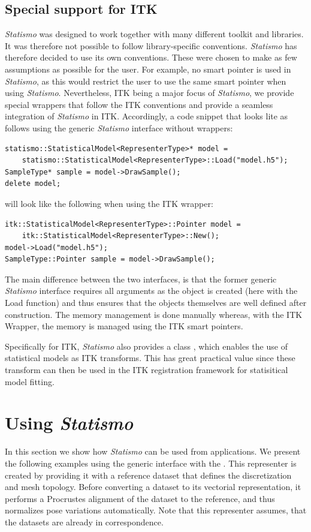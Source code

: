 \documentclass{InsightArticle}
\newcommand{\Statismo}{\emph{Statismo}\xspace}
\begin{document}
\subsection{Special support for ITK}
\Statismo was designed to work together with many different toolkit
and libraries. It was therefore not possible to follow library-specific
conventions. \Statismo has therefore decided to use its own conventions. These
were chosen to make as few assumptions as possible for the user. For example, no smart pointer is used in \Statismo, as
this would restrict the user to use the same smart pointer when using
\Statismo. Nevertheless, ITK being a major focus of \Statismo, we
provide special wrappers that follow the ITK conventions and provide a seamless integration of  \Statismo in ITK. 
Accordingly, a code snippet that looks lite as follows using the generic \Statismo interface without wrappers:
\begin{verbatim}
statismo::StatisticalModel<RepresenterType>* model = 
    statismo::StatisticalModel<RepresenterType>::Load("model.h5");
SampleType* sample = model->DrawSample();
delete model;
\end{verbatim}
will look like the following when using the ITK wrapper:
\begin{verbatim}
itk::StatisticalModel<RepresenterType>::Pointer model = 
    itk::StatisticalModel<RepresenterType>::New();
model->Load("model.h5");
SampleType::Pointer sample = model->DrawSample();
\end{verbatim}
The main difference between the two interfaces, is that the former generic \Statismo interface
requires all arguments as the object is created
(here with the Load function) and thus ensures that 
the objects themselves are well defined after construction.
The memory management is done manually whereas, with the ITK Wrapper, the memory is managed using the ITK smart pointers. 

Specifically for ITK, \Statismo also provides a class , which 
enables the use of statistical models as ITK transforms. This has great practical value since these transform can then be used in the  ITK registration framework for statisitical model fitting. 


\section{Using \Statismo}
In this section we show how \Statismo can be used from
applications. We present the following examples using the generic
interface with the . This representer is
created by providing it with a reference dataset that defines the
discretization and mesh topology. Before converting a dataset to its
vectorial representation, it performs a Procrustes alignment
\cite{TODO} of the dataset to the reference, and thus normalizes pose
variations automatically. Note that this representer assumes, that the
datasets are already in correspondence.
\end{document}
